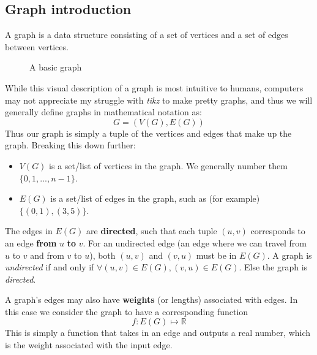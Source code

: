 \documentclass{article}
\begin{document}
\subsection{Graph introduction}
A graph is a data structure consisting of a set of vertices and a set of edges between vertices. 
\begin{figure}[h]
    \centering
    \caption{A basic graph}
    \label{graph-intro-graph}
\end{figure}

While this visual description of a graph is most intuitive to humans, computers may not appreciate my struggle with \textit{tikz} to make pretty graphs, and thus we will generally define graphs in mathematical notation as:
\begin{equation}
    G = (V(G), E(G))
\end{equation}
Thus our graph is simply a tuple of the vertices and edges that make up the graph. Breaking this down further:

\begin{itemize}
    \item $V(G)$ is a set/list of vertices in the graph. We generally number them $\{0, 1, ..., n-1\}$.
    \item $E(G)$ is a set/list of edges in the graph, such as (for example) $\{(0, 1), (3, 5)\}$.
\end{itemize}

The edges in $E(G)$ are \textbf{directed}, such that each tuple $(u, v)$ corresponds to an edge \textbf{from} $u$ \textbf{to} $v$. For an undirected edge (an edge where we can travel from $u$ to $v$ and from $v$ to $u$), both $(u,v)$ and $(v,u)$ must be in $E(G)$. A graph is \textit{undirected} if and only if $\forall (u, v) \in E(G), (v, u) \in E(G)$. Else the graph is \textit{directed}.

A graph's edges may also have \textbf{weights} (or lengths) associated with edges. In this case we consider the graph to have a corresponding function
\begin{equation}
    f: E(G) \mapsto \mathbb{R}
\end{equation}
This is simply a function that takes in an edge and outputs a real number, which is the weight associated with the input edge.
\end{document}
